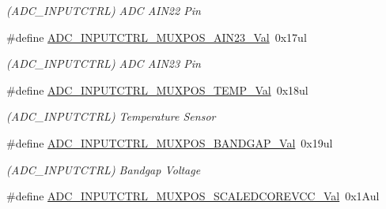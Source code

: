\begin{DoxyCompactItemize}
\begin{DoxyCompactList}\small\item\em (A\+D\+C\+\_\+\+I\+N\+P\+U\+T\+C\+T\+R\+L) A\+D\+C A\+I\+N22 Pin \end{DoxyCompactList}\item 
\hypertarget{group___s_a_m_l21___a_d_c_ga647cce884be7f43f6afafb7b93417ce3}{}\#define \hyperlink{group___s_a_m_l21___a_d_c_ga647cce884be7f43f6afafb7b93417ce3}{A\+D\+C\+\_\+\+I\+N\+P\+U\+T\+C\+T\+R\+L\+\_\+\+M\+U\+X\+P\+O\+S\+\_\+\+A\+I\+N23\+\_\+\+Val}~0x17ul\label{group___s_a_m_l21___a_d_c_ga647cce884be7f43f6afafb7b93417ce3}

\begin{DoxyCompactList}\small\item\em (A\+D\+C\+\_\+\+I\+N\+P\+U\+T\+C\+T\+R\+L) A\+D\+C A\+I\+N23 Pin \end{DoxyCompactList}\item 
\hypertarget{group___s_a_m_l21___a_d_c_ga0e92110d209c9909cd18714850249870}{}\#define \hyperlink{group___s_a_m_l21___a_d_c_ga0e92110d209c9909cd18714850249870}{A\+D\+C\+\_\+\+I\+N\+P\+U\+T\+C\+T\+R\+L\+\_\+\+M\+U\+X\+P\+O\+S\+\_\+\+T\+E\+M\+P\+\_\+\+Val}~0x18ul\label{group___s_a_m_l21___a_d_c_ga0e92110d209c9909cd18714850249870}

\begin{DoxyCompactList}\small\item\em (A\+D\+C\+\_\+\+I\+N\+P\+U\+T\+C\+T\+R\+L) Temperature Sensor \end{DoxyCompactList}\item 
\hypertarget{group___s_a_m_l21___a_d_c_ga06e3489e60e6b9a147d334178bc54804}{}\#define \hyperlink{group___s_a_m_l21___a_d_c_ga06e3489e60e6b9a147d334178bc54804}{A\+D\+C\+\_\+\+I\+N\+P\+U\+T\+C\+T\+R\+L\+\_\+\+M\+U\+X\+P\+O\+S\+\_\+\+B\+A\+N\+D\+G\+A\+P\+\_\+\+Val}~0x19ul\label{group___s_a_m_l21___a_d_c_ga06e3489e60e6b9a147d334178bc54804}

\begin{DoxyCompactList}\small\item\em (A\+D\+C\+\_\+\+I\+N\+P\+U\+T\+C\+T\+R\+L) Bandgap Voltage \end{DoxyCompactList}\item 
\hypertarget{group___s_a_m_l21___a_d_c_ga9d77bb05e49f1e56dce22cdbeda42df3}{}\#define \hyperlink{group___s_a_m_l21___a_d_c_ga9d77bb05e49f1e56dce22cdbeda42df3}{A\+D\+C\+\_\+\+I\+N\+P\+U\+T\+C\+T\+R\+L\+\_\+\+M\+U\+X\+P\+O\+S\+\_\+\+S\+C\+A\+L\+E\+D\+C\+O\+R\+E\+V\+C\+C\+\_\+\+Val}~0x1\+Aul\label{group___s_a_m_l21___a_d_c_ga9d77bb05e49f1e56dce22cdbeda42df3}


\end{DoxyCompactItemize}
